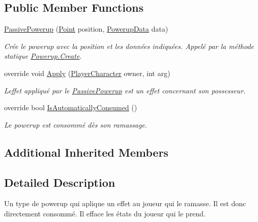 \subsection*{Public Member Functions}
\begin{DoxyCompactItemize}
\item 
\hyperlink{class_tentacle_slicers_1_1actors_1_1_passive_powerup_a36c2f04ef2b3bd32b71f0c866774e995}{Passive\+Powerup} (\hyperlink{class_tentacle_slicers_1_1general_1_1_point}{Point} position, \hyperlink{class_tentacle_slicers_1_1actors_1_1_powerup_data}{Powerup\+Data} data)
\begin{DoxyCompactList}\small\item\em Crée le powerup avec la position et les données indiquées. Appelé par la méthode statique \hyperlink{class_tentacle_slicers_1_1actors_1_1_powerup_a170bfc9101d384a73957470249458cfc}{Powerup.\+Create}. \end{DoxyCompactList}\item 
override void \hyperlink{class_tentacle_slicers_1_1actors_1_1_passive_powerup_a73aed325e29e372952cf46add5377b57}{Apply} (\hyperlink{class_tentacle_slicers_1_1actors_1_1_player_character}{Player\+Character} owner, int arg)
\begin{DoxyCompactList}\small\item\em L\textquotesingle{}effet appliqué par le \hyperlink{class_tentacle_slicers_1_1actors_1_1_passive_powerup}{Passive\+Powerup} est un effet concernant son possesseur. \end{DoxyCompactList}\item 
override bool \hyperlink{class_tentacle_slicers_1_1actors_1_1_passive_powerup_ac419aee4a7dfedee68728f747565f47f}{Is\+Automatically\+Consumed} ()
\begin{DoxyCompactList}\small\item\em Le powerup est consommé dès son ramassage. \end{DoxyCompactList}\end{DoxyCompactItemize}
\subsection*{Additional Inherited Members}


\subsection{Detailed Description}
Un type de powerup qui aplique un effet au joueur qui le ramasse. Il est donc directement consommé. Il efface les états du joueur qui le prend. 



